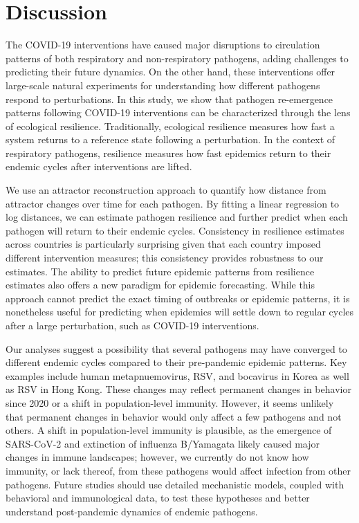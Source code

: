 \documentclass[12pt]{article}
\begin{document}
\section*{Discussion}

The COVID-19 interventions have caused major disruptions to circulation patterns of both respiratory and non-respiratory pathogens, adding challenges to predicting their future dynamics.
On the other hand, these interventions offer large-scale natural experiments for understanding how different pathogens respond to perturbations.
In this study, we show that pathogen re-emergence patterns following COVID-19 interventions can be characterized through the lens of ecological resilience.
Traditionally, ecological resilience measures how fast a system returns to a reference state following a perturbation.
In the context of respiratory pathogens, resilience measures how fast epidemics return to their endemic cycles after interventions are lifted.

We use an attractor reconstruction approach to quantify how distance from attractor changes over time for each pathogen.
By fitting a linear regression to log distances, we can estimate pathogen resilience and further predict when each pathogen will return to their endemic cycles.
Consistency in resilience estimates across countries is particularly surprising given that each country imposed different intervention measures; this consistency provides robustness to our estimates.
The ability to predict future epidemic patterns from resilience estimates also offers a new paradigm for epidemic forecasting.
While this approach cannot predict the exact timing of outbreaks or epidemic patterns, it is nonetheless useful for predicting when epidemics will settle down to regular cycles after a large perturbation, such as COVID-19 interventions.

Our analyses suggest a possibility that several pathogens may have converged to different endemic cycles compared to their pre-pandemic epidemic patterns.
Key examples include human metapnuemovirus, RSV, and bocavirus in Korea as well as RSV in Hong Kong.
These changes may reflect permanent changes in behavior since 2020 or a shift in population-level immunity.
However, it seems unlikely that permanent changes in behavior would only affect a few pathogens and not others.
A shift in population-level immunity is plausible, as the emergence of SARS-CoV-2 and extinction of influenza B/Yamagata likely caused major changes in immune landscapes;
however, we currently do not know how immunity, or lack thereof, from these pathogens would affect infection from other pathogens.
Future studies should use detailed mechanistic models, coupled with behavioral and immunological data, to test these hypotheses and better understand post-pandemic dynamics of endemic pathogens.
\end{document}
